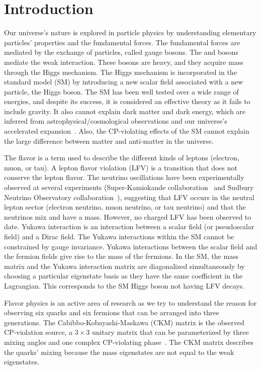 %
%

\chapter{Introduction}
\label{introduction}

Our universe's nature is explored in particle physics by understanding elementary particles' properties and the fundamental forces. The fundamental forces are mediated by the exchange of particles, called gauge bosons. The \PW and \PZ bosons mediate the weak interaction. These bosons are heavy, and they acquire mass through the Higgs mechanism. The Higgs mechanism is incorporated in the standard model (SM) by introducing a new scalar field associated with a new particle, the Higgs boson. The SM has been well tested over a wide range of energies, and despite its success, it is considered an effective theory as it fails to include gravity. It also cannot explain dark matter and dark energy, which are inferred from astrophysical/cosmological observations and our universe's accelerated expansion~\cite{Ade:2015xua}. Also, the CP-violating effects of the SM cannot explain the large difference between matter and anti-matter in the universe.

The flavor is a term used to describe the different kinds of leptons (electron, muon, or tau). A lepton flavor violation (LFV) is a transition that does not conserve the lepton flavor. The neutrino oscillations have been experimentally observed at several experiments (Super-Kamiokande collaboration~\cite{Fukuda:1998mi} and Sudbury Neutrino Observatory collaboration~\cite{Ahmad:2002jz}), suggesting that LFV occurs in the neutral lepton sector (electron neutrino, muon neutrino, or tau neutrino) and that the neutrinos mix and have a mass. However, no charged LFV has been observed to date. Yukawa interaction is an interaction between a scalar field (or pseudoscalar field) and a Dirac field. The Yukawa interactions within the SM cannot be constrained by gauge invariance. Yukawa interactions between the scalar field and the fermion fields give rise to the mass of the fermions. In the SM, the mass matrix and the Yukawa interaction matrix are diagonalized simultaneously by choosing a particular eigenstate basis as they have the same coefficient in the Lagrangian. This corresponds to the SM Higgs boson not having LFV decays.

Flavor physics is an active area of research as we try to understand the reason for observing six quarks and six fermions that can be arranged into three generations. The Cabibbo-Kobayashi-Maskawa (CKM) matrix is the observed CP-violation source, a $3 \times 3$ unitary matrix that can be parameterized by three mixing angles and one complex CP-violating phase~\cite{Tanabashi:2018oca}. The CKM matrix describes the quarks' mixing because the mass eigenstates are not equal to the weak eigenstates.

